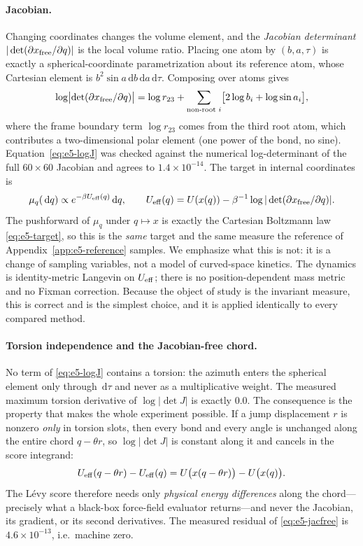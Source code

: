 \documentclass[11pt]{article}
\newcommand{\dd}{\,\mathrm{d}}
\begin{document}
\paragraph{Jacobian.}
Changing coordinates changes the volume element, and the \emph{Jacobian
determinant} $|\det(\partial x_{\rm free}/\partial q)|$ is the local volume
ratio.  Placing one atom by $(b,a,\tau)$ is exactly a spherical-coordinate
parametrization about its reference atom, whose Cartesian element is
$b^2\sin a\dd b\dd a\dd\tau$.  Composing over atoms gives
\begin{equation}
 \log\bigl|\det(\partial x_{\rm free}/\partial q)\bigr|
 =\log r_{23}+\sum_{\text{non-root }i}\bigl[2\log b_i+\log\sin a_i\bigr],
 \label{eq:e5-logJ}
\end{equation}
where the frame boundary term $\log r_{23}$ comes from the third root atom,
which contributes a two-dimensional polar element (one power of the bond, no
sine).  Equation~\eqref{eq:e5-logJ} was checked against the numerical
log-determinant of the full $60\times60$ Jacobian and agrees to
$1.4\times10^{-14}$.  The target in internal coordinates is
\begin{equation}
 \mu_q(\dd q)\propto e^{-\beta U_{\rm eff}(q)}\dd q,
 \qquad
 U_{\rm eff}(q)=U(x(q))-\beta^{-1}\log|\det(\partial x_{\rm free}/\partial q)| .
 \label{eq:e5-ueff}
\end{equation}
The pushforward of $\mu_q$ under $q\mapsto x$ is exactly the Cartesian
Boltzmann law \eqref{eq:e5-target}, so this is the \emph{same} target and the
same measure the reference of Appendix~\ref{app:e5-reference} samples.  We
emphasize what this is not: it is a change of sampling variables, not a model
of curved-space kinetics.  The dynamics is identity-metric Langevin on
$U_{\rm eff}$; there is no position-dependent mass metric and no Fixman
correction.  Because the object of study is the invariant measure, this is
correct and is the simplest choice, and it is applied identically to every
compared method.

\paragraph{Torsion independence and the Jacobian-free chord.}
No term of \eqref{eq:e5-logJ} contains a torsion: the azimuth enters the
spherical element only through $\dd\tau$ and never as a multiplicative weight.
The measured maximum torsion derivative of $\log|\det J|$ is exactly $0.0$.  The
consequence is the property that makes the whole experiment possible.  If a
jump displacement $r$ is nonzero \emph{only} in torsion slots, then every bond
and every angle is unchanged along the entire chord $q-\theta r$, so
$\log|\det J|$ is constant along it and cancels in the score integrand:
\begin{equation}
 U_{\rm eff}(q-\theta r)-U_{\rm eff}(q)
 =U\bigl(x(q-\theta r)\bigr)-U\bigl(x(q)\bigr).
 \label{eq:e5-jacfree}
\end{equation}
The L\'evy score therefore needs only \emph{physical energy differences} along
the chord---precisely what a black-box force-field evaluator returns---and
never the Jacobian, its gradient, or its second derivatives.  The measured
residual of \eqref{eq:e5-jacfree} is $4.6\times10^{-13}$, i.e.\ machine zero.
\end{document}
